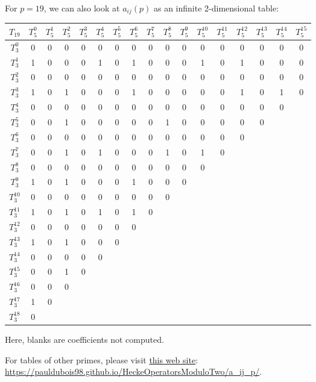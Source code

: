 For $p=19$, we can also look at $a_{ij}(p)$ as an infinite 2-dimensional table:
\begin{center}
	\begin{tabular}{|c||c|c|c|c|c|c|c|c|c|c|c|c|c|c|c|c|}
		\hline
		\textbf{$ T_19$} & \textbf{$ T_5^{0} $} & \textbf{$ T_5^{1} $} & \textbf{$ T_5^{2} $} & \textbf{$ T_5^{3} $} & \textbf{$ T_5^{4} $} & \textbf{$ T_5^{5} $} & \textbf{$ T_5^{6} $} & \textbf{$ T_5^{7} $} & \textbf{$ T_5^{8} $} & \textbf{$ T_5^{9} $} & \textbf{$ T_5^{10} $} & \textbf{$ T_5^{11} $} & \textbf{$ T_5^{12} $} & \textbf{$ T_5^{13} $} & \textbf{$ T_5^{14} $} & \textbf{$ T_5^{15} $} \\
		\hline
		$ T_3^{0} $ & 0 & 0 & 0 & 0 & 0 & 0 & 0 & 0 & 0 & 0 & 0 & 0 & 0 & 0 & 0 & 0 \\
		$ T_3^{1} $ & 1 & 0 & 0 & 0 & 1 & 0 & 1 & 0 & 0 & 0 & 1 & 0 & 1 & 0 & 0 & 0 \\
		$ T_3^{2} $ & 0 & 0 & 0 & 0 & 0 & 0 & 0 & 0 & 0 & 0 & 0 & 0 & 0 & 0 & 0 & 0 \\
		$ T_3^{3} $ & 1 & 0 & 1 & 0 & 0 & 0 & 1 & 0 & 0 & 0 & 0 & 0 & 1 & 0 & 1 & 0 \\
		$ T_3^{4} $ & 0 & 0 & 0 & 0 & 0 & 0 & 0 & 0 & 0 & 0 & 0 & 0 & 0 & 0 & 0 &  \\
		$ T_3^{5} $ & 0 & 0 & 1 & 0 & 0 & 0 & 0 & 0 & 1 & 0 & 0 & 0 & 0 & 0 &  &  \\
		$ T_3^{6} $ & 0 & 0 & 0 & 0 & 0 & 0 & 0 & 0 & 0 & 0 & 0 & 0 & 0 &  &  &  \\
		$ T_3^{7} $ & 0 & 0 & 1 & 0 & 1 & 0 & 0 & 0 & 1 & 0 & 1 & 0 &  &  &  &  \\
		$ T_3^{8} $ & 0 & 0 & 0 & 0 & 0 & 0 & 0 & 0 & 0 & 0 & 0 &  &  &  &  &  \\
		$ T_3^{9} $ & 1 & 0 & 1 & 0 & 0 & 0 & 1 & 0 & 0 & 0 &  &  &  &  &  &  \\
		$ T_3^{10} $ & 0 & 0 & 0 & 0 & 0 & 0 & 0 & 0 & 0 &  &  &  &  &  &  &  \\
		$ T_3^{11} $ & 1 & 0 & 1 & 0 & 1 & 0 & 1 & 0 &  &  &  &  &  &  &  &  \\
		$ T_3^{12} $ & 0 & 0 & 0 & 0 & 0 & 0 & 0 &  &  &  &  &  &  &  &  &  \\
		$ T_3^{13} $ & 1 & 0 & 1 & 0 & 0 & 0 &  &  &  &  &  &  &  &  &  &  \\
		$ T_3^{14} $ & 0 & 0 & 0 & 0 & 0 &  &  &  &  &  &  &  &  &  &  &  \\
		$ T_3^{15} $ & 0 & 0 & 1 & 0 &  &  &  &  &  &  &  &  &  &  &  &  \\
		$ T_3^{16} $ & 0 & 0 & 0 &  &  &  &  &  &  &  &  &  &  &  &  &  \\
		$ T_3^{17} $ & 1 & 0 &  &  &  &  &  &  &  &  &  &  &  &  &  &  \\
		$ T_3^{18} $ & 0 &  &  &  &  &  &  &  &  &  &  &  &  &  &  &  \\
		\hline
	\end{tabular}

	Here, blanks are coefficients not computed.
\end{center}
For tables of other primes, please visit \href{https://pauldubois98.github.io/HeckeOperatorsModuloTwo/a_ij_p/}{this web site}:\\ \url{https://pauldubois98.github.io/HeckeOperatorsModuloTwo/a_ij_p/}.


